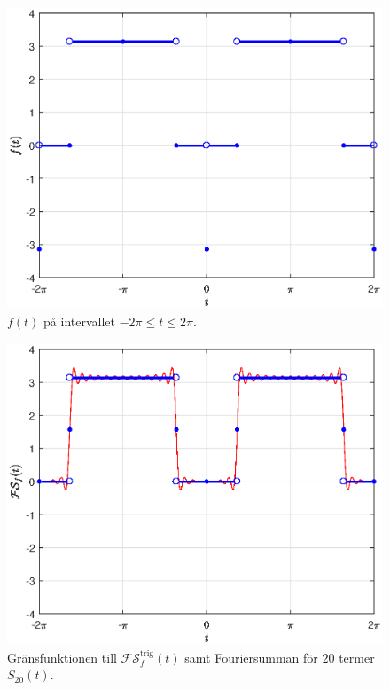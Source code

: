 \documentclass[a4paper]{article}
\begin{document}
\begin{figure}[h!]
  \centering
  \includegraphics[width=\linewidth]{funk23.eps}
  \caption{$f(t)$ på intervallet $-2\pi \leq t \leq 2\pi$.}
  \label{fig:funk23}
\end{figure} 
\begin{figure}[h!]
  \centering
  \includegraphics[width=\linewidth]{fourier23.eps}
  \caption{Gränsfunktionen till $\mathcal{FS}_f^{\text{trig}}(t)$ samt
    Fouriersumman för $20$ termer $S_{20}(t)$.}
  \label{fig:fourier23}
\end{figure} 
\end{document}
